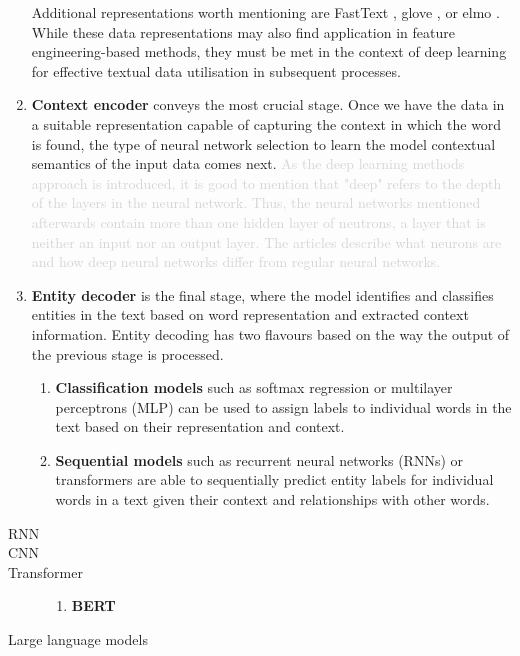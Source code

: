 \begin{enumerate}
    Additional representations worth mentioning are FastText \parencite{joulin2016bagfasttext}, \acrfull{glove} \parencite{pennington-etal-2014-glove}, or \acrfull{elmo} \parencite{peters2018elmo}. While these data representations may also find application in feature engineering-based methods, they must be met in the context of deep learning for effective textual data utilisation in subsequent processes.
    \item \textbf{Context encoder} conveys the most crucial stage. Once we have the data in a suitable representation capable of capturing the context in which the word is found, the type of neural network selection to learn the model contextual semantics of the input data comes next. \textcolor{lightgray}{As the deep learning methods approach is introduced, it is good to mention that "deep" refers to the depth of the layers in the neural network. Thus, the neural networks mentioned afterwards contain more than one hidden layer of neutrons, a layer that is neither an input nor an output layer. The articles \parencites{ibm_neural_networks}{ibm_ai_ml_dl_nn} describe what neurons are and how deep neural networks differ from regular neural networks.}   
    \item \textbf{Entity decoder} is the final stage, where the model identifies and classifies entities in the text based on word representation and extracted context information. Entity decoding has two flavours based on the way the output of the previous stage is processed. 
    
    \begin{enumerate}
        \item \textbf{Classification models} such as softmax regression or multilayer perceptrons (MLP) can be used to assign labels to individual words in the text based on their representation and context. %
        \item \textbf{Sequential models} such as recurrent neural networks (RNNs) or transformers are able to sequentially predict entity labels for individual words in a text given their context and relationships with other words. %
    \end{enumerate}
\end{enumerate}

\begin{description}
    \item[RNN] 
    \item[CNN] 
    \item[Transformer]
    \begin{enumerate}
        \item \textbf{BERT}
    \end{enumerate}
    
    \item[Large language models]  
\end{description}

